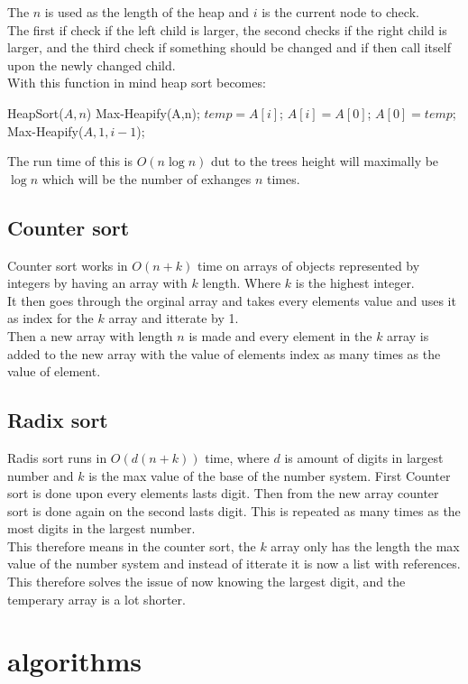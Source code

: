 \documentclass[12pt, a4paper]{article}
\begin{document}
				The $n$ is used as the length of the heap and $i$ is the current node to check.\\
				The first if check if the left child is larger, the second checks if the right child is larger, and the third check if something should be changed and if then call itself upon the newly changed child.\\
				With this function in mind heap sort becomes: 
				\begin{algorithmic}[1]
					\State HeapSort($A,n$)
						\State Max-Heapify(A,n);
							\State $temp = A[i]$;
							\State $A[i] = A[0]$;
							\State $A[0] = temp$;
							\State Max-Heapify($A,1,i-1$);
						\EndFor
				\end{algorithmic}
				The run time of this is $O(n\log n)$ dut to the trees height will maximally be $\log n$ which will be the number of exhanges $n$ times.
			\subsection{Counter sort}
				Counter sort works in $O(n+k)$ time on arrays of objects represented by integers by having an array with $k$ length. Where $k$ is the highest integer.\\
				It then goes through the orginal array and takes every elements value and uses it as index for the $k$ array and itterate by 1.\\
				Then a new array with length $n$ is made and every element in the $k$ array is added to the new array with the value of elements index as many times as the value of element.
			\subsection{Radix sort}
				Radis sort runs in $O(d(n+k))$ time, where $d$ is amount of digits in largest number and $k$ is the max value of the base of the number system. First Counter sort is done upon every elements lasts digit. Then from the new array counter sort is done again on the second lasts digit. This is repeated as many times as the most digits in the largest number.\\
				This therefore means in the counter sort, the $k$ array only has the length the max value of the number system and instead of itterate it is now a list with references.\\
				This therefore solves the issue of now knowing the largest digit, and the temperary array is a lot shorter.
		\section{algorithms}
\end{document}
